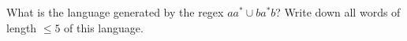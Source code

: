 What is the language generated by the regex $aa^* \cup ba^*b$?
Write down all words of length $\leq 5$ of this language.
